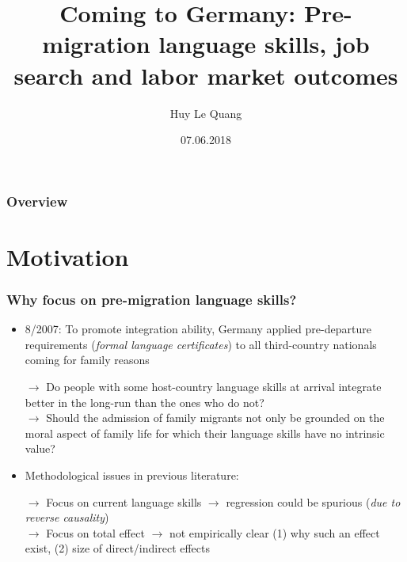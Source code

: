 \documentclass{beamer}
\title[]{Coming to Germany: Pre-migration language skills, job search and labor market outcomes} %
\author{Huy Le Quang} %
\date{07.06.2018} %
\begin{document}
\begin{frame}
\titlepage %
\end{frame}

\begin{frame}
\frametitle{Overview} %
\tableofcontents %
\end{frame}


\section{Motivation} %

\begin{frame}
\frametitle{Why focus on pre-migration language skills?}
\begin{itemize}

\item 8/2007: To promote integration ability, Germany applied pre-departure requirements (\textit{formal language certificates}) to all third-country nationals coming for family reasons  

$\rightarrow$ Do people with some host-country language skills at arrival integrate better in the long-run than the ones who do not? \\
$\rightarrow$ Should the admission of family migrants not only be grounded on the moral aspect of family life for which their language skills have no intrinsic value?

\item Methodological issues in previous literature:

$\rightarrow$ Focus on current language skills $\rightarrow$ regression could be spurious (\textit{due to reverse causality}) \\
$\rightarrow$ Focus on total effect $\rightarrow$  not empirically clear (1) why such an effect exist, (2) size of direct/indirect effects
\end{itemize}

\end{frame}
\end{document}
